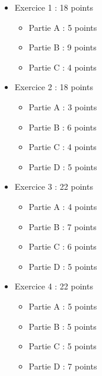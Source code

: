 \documentclass[11pt,a4paper]{article}
\begin{document}
\begin{itemize}[leftmargin=1.8em]
    \item Exercice 1 : 18 points
    \begin{itemize}
        \item Partie A : 5 points
        \item Partie B : 9 points
        \item Partie C : 4 points
    \end{itemize}
    \item Exercice 2 : 18 points
    \begin{itemize}
        \item Partie A : 3 points
        \item Partie B : 6 points
        \item Partie C : 4 points
        \item Partie D : 5 points
    \end{itemize}
    \item Exercice 3 : 22 points
    \begin{itemize}
        \item Partie A : 4 points
        \item Partie B : 7 points
        \item Partie C : 6 points
        \item Partie D : 5 points
    \end{itemize}
    \item Exercice 4 : 22 points
    \begin{itemize}
        \item Partie A : 5 points
        \item Partie B : 5 points
        \item Partie C : 5 points
        \item Partie D : 7 points
    \end{itemize}
\end{itemize}
\end{document}
